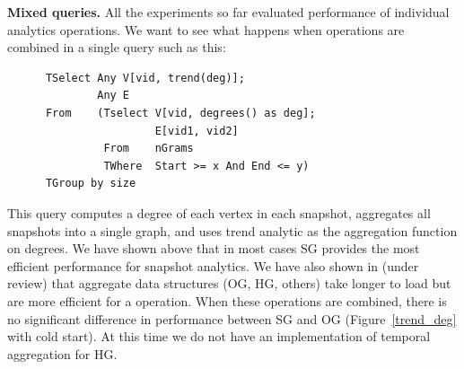 
{\bf Mixed queries.} All the experiments so far evaluated performance
of individual \ql analytics operations.  We want to see what happens
when operations are combined in a single query such as this:

\begin{small}
\begin{verbatim}
      TSelect Any V[vid, trend(deg)];
              Any E
      From    (Tselect V[vid, degrees() as deg]; 
                       E[vid1, vid2]
               From    nGrams
               TWhere  Start >= x And End <= y)
      TGroup by size
\end{verbatim}
\end{small}

This query computes a degree of each vertex in each snapshot,
aggregates all snapshots into a single graph, and uses trend analytic
as the aggregation function on degrees.  We have shown above that in
most cases SG provides the most efficient performance for snapshot
analytics.  We have also shown in (under review) that aggregate data
structures (OG, HG, others) take longer to load but are more efficient
for a  operation.  When these operations are combined,
there is no significant difference in performance between SG and OG
(Figure~\ref{trend_deg} with cold start).  At this time we do not have
an implementation of temporal aggregation for HG.

